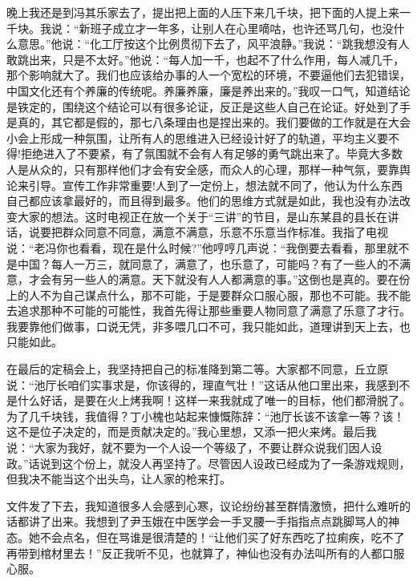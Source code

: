 \documentclass[12pt,oneside]{book}
\begin{document}
晚上我还是到冯其乐家去了，提出把上面的人压下来几千块，把下面的人提上来一千块。我说：``新班子成立才一年多，让别人在心里嘀咕，也许还骂几句，也没什么意思。''他说：``化工厅按这个比例贯彻下去了，风平浪静。''我说：``跳我想没有人敢跳出来，只是不太好。''他说：``每人加一千，也起不了什么作用，每人减几千，那个影响就大了。我们也应该给办事的人一个宽松的环境，不要逼他们去犯错误，中国文化还有个养廉的传统呢。养廉养廉，廉是养出来的。''我叹一口气，知道结论是铁定的，围绕这个结论可以有很多论证，反正是这些人自己在论证。好处到了手是真的，其它都是假的，那七八条理由也是捏出来的。我们要做的工作就是在大会小会上形成一种氛围，让所有人的思维进入已经设计好了的轨道，平均主义要不得!拒绝进入了不要紧，有了氛围就不会有人有足够的勇气跳出来了。毕竟大多数人是从众的，只有那样他们才会有安全感，而众人的心理，那样一种气氛，要靠舆论来引导。宣传工作非常重要!人到了一定份上，想法就不同了，他认为什么东西自己都应该拿最好的，而且得到最多。他们的思维方式就是如此，我也没有办法改变大家的想法。这时电视正在放一个关于``三讲''的节目，是山东某县的县长在讲话，说要把群众同意不同意，满意不满意，乐意不乐意当作标准。我指了电视说：``老冯你也看看，现在是什么时候?''他哼哼几声说：``我倒要去看看，那里就不是中国？每人一万三，就同意了，满意了，也乐意了，可能吗？有了一些人的不满意，才会有另一些人的满意。天下就没有人人都满意的事。''这倒也是真的。要在份上的人不为自己谋点什么，那不可能，于是要群众口服心服，那也不可能。我不能去追求那种不可能的可能性，我首先得让那些重要人物同意了满意了乐意了才行。我要靠他们做事，口说无凭，非多喂几口不可，我只能如此，道理讲到天上去，也只能如此。

在最后的定稿会上，我坚持把自己的标准降到第二等。大家都不同意，丘立原说：``池厅长咱们实事求是，你该得的，理直气壮！''这话从他口里出来，我感到不是什么好话，是要在火上烤我啊！这样一来我就成了唯一的目标，他们都滑脱了。为了几千块钱，我值得？丁小槐也站起来慷慨陈辞：``池厅长该不该拿一等？该！这不是位子决定的，而是贡献决定的。''我心里想，又添一把火来烤。最后我说：``大家为我好，就不要为一个人设一个等级了，不要让群众说我们因人设政。''话说到这个份上，就没人再坚持了。尽管因人设政已经成为了一条游戏规则，但我决不能当这个出头鸟，让人家的枪来打。

文件发了下去，我知道很多人会感到心寒，议论纷纷甚至群情激愤，把什么难听的话都讲了出来。我想到了尹玉娥在中医学会一手叉腰一手指指点点跳脚骂人的神态。她不会点名，但在骂谁是很清楚的！``让他们买了好东西吃了拉痢疾，吃不了再带到棺材里去！''反正我听不见，也就算了，神仙也没有办法叫所有的人都口服心服。
\end{document}
